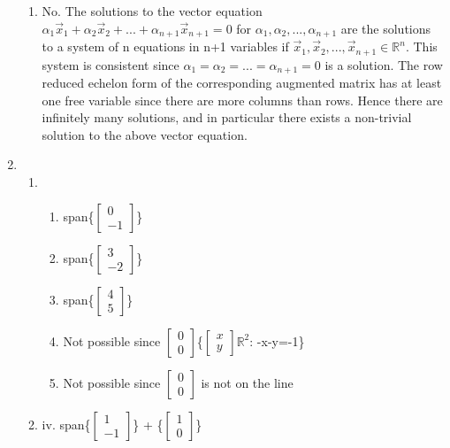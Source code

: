 \documentclass{article}
\begin{document}
\begin{solution}
\begin{enumerate}
\begin{enumerate}
                \item No. The solutions to the vector equation $\alpha_{1}\Vec{x}_{1}+\alpha_{2}\Vec{x}_{2}+...+\alpha_{n+1}\Vec{x}_{n+1}=0$ for $\alpha_{1},\alpha_{2},...,\alpha_{n+1}$ are the solutions to a system of n equations in n+1 variables if $\Vec{x}_{1},\Vec{x}_{2},...,\Vec{x}_{n+1}\in \mathbb{R}^{n}$. This system is consistent since $\alpha_{1}=\alpha_{2}=...=\alpha_{n+1}=0$ is a solution. The row reduced echelon form of the corresponding augmented matrix has at least one free variable since there are more columns than rows. Hence there are infinitely many solutions, and in particular there exists a non-trivial solution to the above vector equation.
            \end{enumerate}
        \item 
            \begin{enumerate}
                \item
                \begin{enumerate}
                    \item span\{$\begin{bmatrix}0\\-1\end{bmatrix}$\}
                    \item span\{$\begin{bmatrix}3\\-2\end{bmatrix}$\}
                    \item span\{$\begin{bmatrix}4\\5\end{bmatrix}$\}
                    \item Not possible since $\begin{bmatrix}0\\0\end{bmatrix}$\notin \{$\begin{bmatrix}x\\y\end{bmatrix}$\in $\mathbb{R}^{2}$: -x-y=-1\}
                    \item Not possible since $\begin{bmatrix}0\\0\end{bmatrix}$ is not on the line
                \end{enumerate}
                \item
                    iv. span\{$\begin{bmatrix}1\\-1\end{bmatrix}$\} + \{$\begin{bmatrix}1\\0\end{bmatrix}$\}\\

\end{enumerate}
\end{enumerate}
\end{solution}
\end{document}
